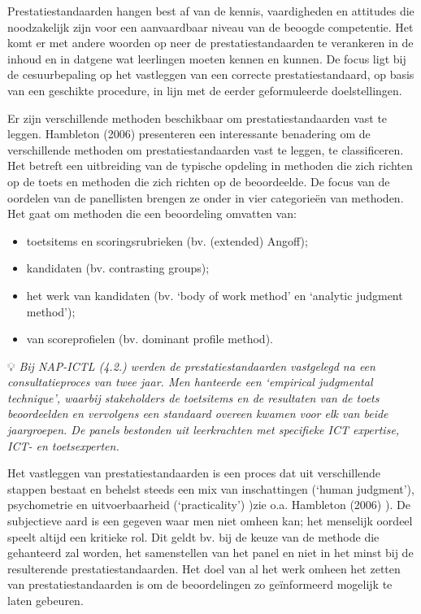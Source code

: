 \documentclass[
  letterpaper,
]{report}
\providecommand{\tightlist}{%
  \setlength{\itemsep}{0pt}\setlength{\parskip}{0pt}}
\begin{document}
Prestatiestandaarden hangen best af van de kennis, vaardigheden en
attitudes die noodzakelijk zijn voor een aanvaardbaar niveau van de
beoogde competentie. Het komt er met andere woorden op neer de
prestatiestandaarden te verankeren in de inhoud en in datgene wat
leerlingen moeten kennen en kunnen. De focus ligt bij de cesuurbepaling
op het vastleggen van een correcte prestatiestandaard, op basis van een
geschikte procedure, in lijn met de eerder geformuleerde doelstellingen.

Er zijn verschillende methoden beschikbaar om prestatiestandaarden vast
te leggen. Hambleton (2006) presenteren een interessante benadering om
de verschillende methoden om prestatiestandaarden vast te leggen, te
classificeren. Het betreft een uitbreiding van de typische opdeling in
methoden die zich richten op de toets en methoden die zich richten op de
beoordeelde. De focus van de oordelen van de panellisten brengen ze
onder in vier categorieën van methoden. Het gaat om methoden die een
beoordeling omvatten van:

\begin{itemize}
\tightlist
\item
  toetsitems en scoringsrubrieken (bv. (extended) Angoff);
\item
  kandidaten (bv. contrasting groups);
\item
  het werk van kandidaten (bv. `body of work method' en `analytic
  judgment method');
\item
  van scoreprofielen (bv. dominant profile method).
\end{itemize}

💡 \emph{Bij NAP-ICTL (4.2.) werden de prestatiestandaarden vastgelegd
na een consultatieproces van twee jaar. Men hanteerde een `empirical
judgmental technique', waarbij stakeholders de toetsitems en de
resultaten van de toets beoordeelden en vervolgens een standaard overeen
kwamen voor elk van beide jaargroepen. De panels bestonden uit
leerkrachten met specifieke ICT expertise, ICT- en toetsexperten.}

Het vastleggen van prestatiestandaarden is een proces dat uit
verschillende stappen bestaat en behelst steeds een mix van
inschattingen (`human judgment'), psychometrie en uitvoerbaarheid
(`practicality') )zie o.a. Hambleton (2006) ). De subjectieve aard is
een gegeven waar men niet omheen kan; het menselijk oordeel speelt
altijd een kritieke rol. Dit geldt bv. bij de keuze van de methode die
gehanteerd zal worden, het samenstellen van het panel en niet in het
minst bij de resulterende prestatiestandaarden. Het doel van al het werk
omheen het zetten van prestatiestandaarden is om de beoordelingen zo
geïnformeerd mogelijk te laten gebeuren.
\end{document}
